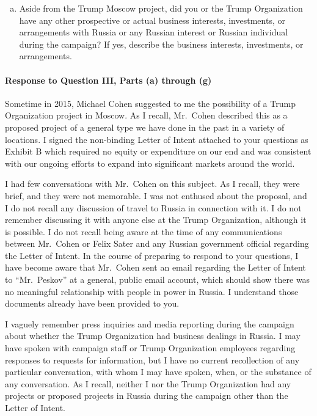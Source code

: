 \begin{enumerate}[a.]
\item Aside from the Trump Moscow project, did you or the Trump Organization have any other prospective or actual business interests, investments, or arrangements with Russia or any Russian interest or Russian individual during the campaign?
If yes, describe the business interests, investments, or arrangements.

\end{enumerate}

\paragraph*{Response to Question III, Parts (a) through (g)}

Sometime in 2015, Michael Cohen suggested to me the possibility of a Trump Organization project in Moscow.
As I recall, Mr.~Cohen described this as a proposed project of a general type we have done in the past in a variety of locations.
I signed the non-binding Letter of Intent attached to your questions as Exhibit B which required no equity or expenditure on our end and was consistent with our ongoing efforts to expand into significant markets around the world.

I had few conversations with Mr.~Cohen on this subject.
As I recall, they were brief, and they were not memorable.
I was not enthused about the proposal, and I do not recall any discussion of travel to Russia in connection with it.
I do not remember discussing it with anyone else at the Trump Organization, although it is possible.
I do not recall being aware at the time of any communications between Mr.~Cohen or Felix Sater and any Russian government official regarding the Letter of Intent.
In the course of preparing to respond to your questions, I have become aware that Mr.~Cohen sent an email regarding the Letter of Intent to ``Mr.~Peskov'' at a general, public email account, which should show there was no meaningful relationship with people in power in Russia.
I understand those documents already have been provided to you.

I vaguely remember press inquiries and media reporting during the campaign about whether the Trump Organization had business dealings in Russia.
I may have spoken with campaign staff or Trump Organization employees regarding responses to requests for information, but I have no current recollection of any particular conversation, with whom I may have spoken, when, or the substance of any conversation.
As I recall, neither I nor the Trump Organization had any projects or proposed projects in Russia during the campaign other than the Letter of Intent.

